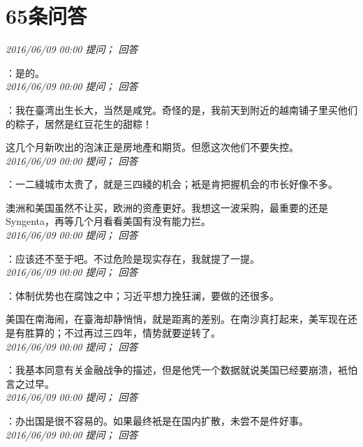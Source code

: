 \documentclass[twocolumn]{ctexart}
\begin{document}
\section{65条问答}

\textit{\hfill\noindent\small 2016/06/09 00:00 提问； 回答}

：是的。\\

\textit{\hfill\noindent\small 2016/06/09 00:00 提问； 回答}

：我在臺湾出生长大，当然是咸党。奇怪的是，我前天到附近的越南铺子里买他们的粽子，居然是红豆花生的甜粽！

这几个月新吹出的泡沫正是房地產和期货。但愿这次他们不要失控。\\

\textit{\hfill\noindent\small 2016/06/09 00:00 提问； 回答}

：一二綫城市太贵了，就是三四綫的机会；衹是肯把握机会的市长好像不多。

澳洲和美国虽然不让买，欧洲的资產更好。我想这一波采购，最重要的还是Syngenta，再等几个月看看美国有没有能力拦。\\

\textit{\hfill\noindent\small 2016/06/09 00:00 提问； 回答}

：应该还不至于吧。不过危险是现实存在，我就提了一提。\\

\textit{\hfill\noindent\small 2016/06/09 00:00 提问； 回答}

：体制优势也在腐蚀之中；习近平想力挽狂澜，要做的还很多。

美国在南海闹，在臺海却静悄悄，就是距离的差别。在南沙真打起来，美军现在还是有胜算的；不过再过三四年，情势就要逆转了。\\

\textit{\hfill\noindent\small 2016/06/09 00:00 提问； 回答}

：我基本同意有关金融战争的描述，但是他凭一个数据就说美国已经要崩溃，衹怕言之过早。\\

\textit{\hfill\noindent\small 2016/06/09 00:00 提问； 回答}

：办出国是很不容易的。如果最终衹是在国内扩散，未尝不是件好事。\\

\textit{\hfill\noindent\small 2016/06/09 00:00 提问； 回答}
\end{document}
